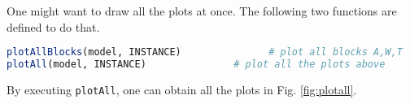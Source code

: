 One might want to draw all the plots at once. The following two functions are defined to do that.
\begin{lstlisting}[frame=single,language=julia]
plotAllBlocks(model, INSTANCE)               # plot all blocks A,W,T
plotAll(model, INSTANCE)               # plot all the plots above
\end{lstlisting}

By executing \texttt{plotAll}, one can obtain all the plots in Fig. \ref{fig:plotall}.
%
%
%
